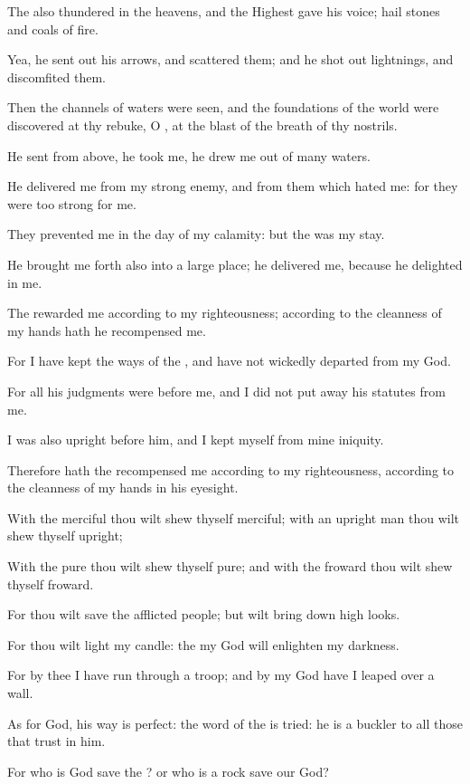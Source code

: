 \verse The \LORD also thundered in the heavens, and the Highest gave his voice; hail stones and coals of fire.

\verse Yea, he sent out his arrows, and scattered them; and he shot out lightnings, and discomfited them.

\verse Then the channels of waters were seen, and the foundations of the world were discovered at thy rebuke, O \LORD, at the blast of the breath of thy nostrils.

\verse He sent from above, he took me, he drew me out of many waters.

\verse He delivered me from my strong enemy, and from them which hated me: for they were too strong for me.

\verse They prevented me in the day of my calamity: but the \LORD was my stay.

\verse He brought me forth also into a large place; he delivered me, because he delighted in me.

\verse The \LORD rewarded me according to my righteousness; according to the cleanness of my hands hath he recompensed me.

\verse For I have kept the ways of the \LORD, and have not wickedly departed from my God.

\verse For all his judgments were before me, and I did not put away his statutes from me.

\verse I was also upright before him, and I kept myself from mine iniquity.

\verse Therefore hath the \LORD recompensed me according to my righteousness, according to the cleanness of my hands in his eyesight.

\verse With the merciful thou wilt shew thyself merciful; with an upright man thou wilt shew thyself upright;

\verse With the pure thou wilt shew thyself pure; and with the froward thou wilt shew thyself froward.

\verse For thou wilt save the afflicted people; but wilt bring down high looks.

\verse For thou wilt light my candle: the \LORD my God will enlighten my darkness.

\verse For by thee I have run through a troop; and by my God have I leaped over a wall.

\verse As for God, his way is perfect: the word of the \LORD is tried: he is a buckler to all those that trust in him.

\verse For who is God save the \LORD? or who is a rock save our God?

